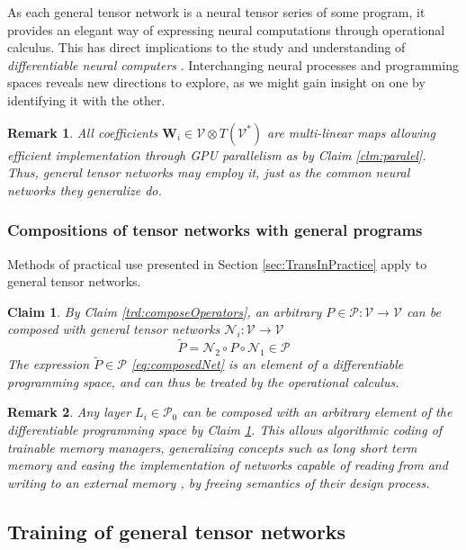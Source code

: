 \documentclass[smallcondensed]{svjour3}
\newcommand{\bfW}{\mathbf{W}}
\newcommand{\VV}{\mathcal{V}}
\newcommand{\NN}{\mathcal{N}}
\newcommand{\dP}{\mathcal{P}}
\newtheorem{trditev}{Claim}[section]
\newtheorem{opomba}{Remark}[section]
\begin{document}
As each general tensor network is a neural tensor series of some program, it provides an elegant way of expressing neural computations through operational calculus. 
This has direct implications to the study and understanding of \emph{differentiable neural computers} \cite{netRam}. Interchanging neural processes and programming spaces reveals new directions to explore, as we might gain insight on one by identifying it with the other.


\begin{opomba}
All coefficients $\bfW_i\in \VV\otimes T(\VV^*)$ are multi-linear maps allowing efficient implementation through GPU parallelism as by Claim \ref{clm:paralel}. Thus, general tensor networks may employ it, just as the common neural networks they generalize do.
\end{opomba}

\subsubsection{Compositions of tensor networks with general programs}\label{sec:compoNetProg}

Methods of practical use presented in Section \ref{sec:TransInPractice} apply to general tensor networks.
\begin{trditev}\label{clm:composedNet}
By Claim \ref{trd:composeOperators}, an arbitrary $P\in\dP:\VV\to\VV$ can be composed with general tensor networks $\NN_i:\VV\to\VV$ 
\begin{equation}\label{eq:composedNet}
\tilde{P}=\NN_2\circ P\circ\NN_1 \in \dP
\end{equation}
The expression $\tilde{P}\in\dP$ \eqref{eq:composedNet} is an element of a differentiable programming space, and can thus be treated by the operational calculus. 
\end{trditev}

\begin{opomba}
Any layer $L_i\in\dP_0$ can be composed with an arbitrary element of the differentiable programming space by Claim  \ref{clm:composedNet}. This allows algorithmic coding of trainable memory managers, generalizing concepts such as long short term memory \cite{LSTM} and easing the implementation of networks capable of reading from and writing to an external memory \cite{netRam}, by freeing semantics of their design process.
\end{opomba}

\subsection{Training of general tensor networks}\label{sec:trainNet}
\end{document}
